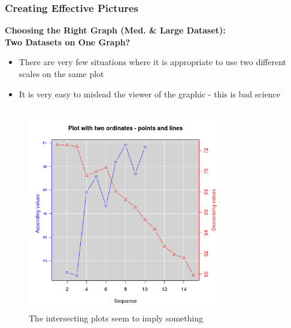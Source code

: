 \documentclass{beamer}
\begin{document}

\begin{frame}
\frametitle{Creating Effective Pictures}
\textbf{Choosing the Right Graph (Med. \& Large Dataset):\\ Two Datasets on One Graph?}\\
\vspace{0.2cm}
\begin{itemize}
\item There are very few situations where it is appropriate to use two different scales on the same plot
\vspace{0.2cm}
\item It is very easy to mislead the viewer of the graphic - this is bad science
\end{itemize}
\vspace{-0.4cm}
\begin{columns}
\begin{figure}
\includegraphics[scale=0.2]{2plot_1}
\vspace{-0.3cm}
\caption{The intersecting plots seem to imply something}
\end{figure}
\begin{figure}

\end{figure}
\end{columns}
\end{frame}
\end{document}
